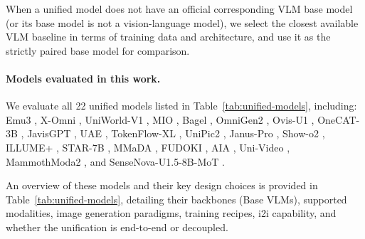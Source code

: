 \documentclass{article}
\theoremstyle{plain}
\theoremstyle{definition}
\theoremstyle{remark}
\begin{document}
When a unified model does not have an official corresponding VLM base model (or its base model is not a vision-language model), we select the closest available VLM baseline in terms of training data and architecture, and use it as the strictly paired base model for comparison.

\paragraph{Models evaluated in this work.}
We evaluate all 22 unified models listed in Table~\ref{tab:unified-models}, including: Emu3 \cite{wang2024emu3}, X-Omni \cite{geng2025xomni}, UniWorld-V1 \cite{lin2025uniworld}, MIO \cite{hu2025mio}, Bagel \cite{deng2025bagel}, OmniGen2 \cite{xiao2024omnigen}, Ovis-U1 \cite{wang2025ovisu1}, OneCAT-3B \cite{peng2025onecat}, JavisGPT \cite{liu2025javisgpt}, UAE \cite{yuan2025uae}, TokenFlow-XL \cite{li2024tokenflow}, UniPic2 \cite{peng2025unipic2}, Janus-Pro \cite{chen2025januspro}, Show-o2 \cite{xie2025showo2}, ILLUME+ \cite{zhang2025illume}, STAR-7B \cite{li2025star}, MMaDA \cite{yang2025mmada}, FUDOKI \cite{wang2025fudoki}, AIA \cite{zheng2025aia}, Uni-Video \cite{wei2025univideo}, MammothModa2 \cite{shen2025mammothmoda2}, and SenseNova-U1.5-8B-MoT \cite{diao2026sensenovau15}.

An overview of these models and their key design choices is provided in Table~\ref{tab:unified-models}, detailing their backbones (Base VLMs), supported modalities, image generation paradigms, training recipes, i2i capability, and whether the unification is end-to-end or decoupled.
\end{document}
